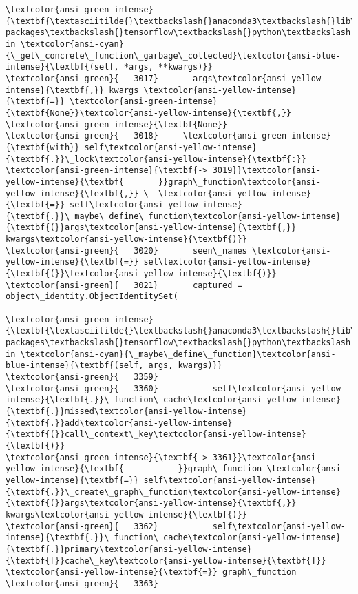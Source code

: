 \documentclass[11pt]{article}
\begin{document}
\begin{Verbatim}[commandchars=\\\{\}, frame=single, framerule=2mm, rulecolor=\color{outerrorbackground}]
\textcolor{ansi-green-intense}{\textbf{\textasciitilde{}\textbackslash{}anaconda3\textbackslash{}lib\textbackslash{}site-packages\textbackslash{}tensorflow\textbackslash{}python\textbackslash{}eager\textbackslash{}function.py}} in \textcolor{ansi-cyan}{\_get\_concrete\_function\_garbage\_collected}\textcolor{ansi-blue-intense}{\textbf{(self, *args, **kwargs)}}
\textcolor{ansi-green}{   3017}       args\textcolor{ansi-yellow-intense}{\textbf{,}} kwargs \textcolor{ansi-yellow-intense}{\textbf{=}} \textcolor{ansi-green-intense}{\textbf{None}}\textcolor{ansi-yellow-intense}{\textbf{,}} \textcolor{ansi-green-intense}{\textbf{None}}
\textcolor{ansi-green}{   3018}     \textcolor{ansi-green-intense}{\textbf{with}} self\textcolor{ansi-yellow-intense}{\textbf{.}}\_lock\textcolor{ansi-yellow-intense}{\textbf{:}}
\textcolor{ansi-green-intense}{\textbf{-> 3019}}\textcolor{ansi-yellow-intense}{\textbf{       }}graph\_function\textcolor{ansi-yellow-intense}{\textbf{,}} \_ \textcolor{ansi-yellow-intense}{\textbf{=}} self\textcolor{ansi-yellow-intense}{\textbf{.}}\_maybe\_define\_function\textcolor{ansi-yellow-intense}{\textbf{(}}args\textcolor{ansi-yellow-intense}{\textbf{,}} kwargs\textcolor{ansi-yellow-intense}{\textbf{)}}
\textcolor{ansi-green}{   3020}       seen\_names \textcolor{ansi-yellow-intense}{\textbf{=}} set\textcolor{ansi-yellow-intense}{\textbf{(}}\textcolor{ansi-yellow-intense}{\textbf{)}}
\textcolor{ansi-green}{   3021}       captured = object\_identity.ObjectIdentitySet(

\textcolor{ansi-green-intense}{\textbf{\textasciitilde{}\textbackslash{}anaconda3\textbackslash{}lib\textbackslash{}site-packages\textbackslash{}tensorflow\textbackslash{}python\textbackslash{}eager\textbackslash{}function.py}} in \textcolor{ansi-cyan}{\_maybe\_define\_function}\textcolor{ansi-blue-intense}{\textbf{(self, args, kwargs)}}
\textcolor{ansi-green}{   3359} 
\textcolor{ansi-green}{   3360}           self\textcolor{ansi-yellow-intense}{\textbf{.}}\_function\_cache\textcolor{ansi-yellow-intense}{\textbf{.}}missed\textcolor{ansi-yellow-intense}{\textbf{.}}add\textcolor{ansi-yellow-intense}{\textbf{(}}call\_context\_key\textcolor{ansi-yellow-intense}{\textbf{)}}
\textcolor{ansi-green-intense}{\textbf{-> 3361}}\textcolor{ansi-yellow-intense}{\textbf{           }}graph\_function \textcolor{ansi-yellow-intense}{\textbf{=}} self\textcolor{ansi-yellow-intense}{\textbf{.}}\_create\_graph\_function\textcolor{ansi-yellow-intense}{\textbf{(}}args\textcolor{ansi-yellow-intense}{\textbf{,}} kwargs\textcolor{ansi-yellow-intense}{\textbf{)}}
\textcolor{ansi-green}{   3362}           self\textcolor{ansi-yellow-intense}{\textbf{.}}\_function\_cache\textcolor{ansi-yellow-intense}{\textbf{.}}primary\textcolor{ansi-yellow-intense}{\textbf{[}}cache\_key\textcolor{ansi-yellow-intense}{\textbf{]}} \textcolor{ansi-yellow-intense}{\textbf{=}} graph\_function
\textcolor{ansi-green}{   3363} 


\end{Verbatim}
\end{document}
